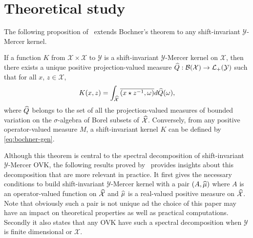 \section{Theoretical study}
The following proposition of~\citet{Zhang2012,Carmeli2010} extends Bochner's
theorem to any shift-invariant $\mathcal{Y}$-Mercer kernel.
\begin{proposition}
    \label{pr:operator_valued_bochner}
    If a function $K$ from $\mathcal{X} \times \mathcal{X}$ to $\mathcal{Y}$ is
    a shift-invariant $\mathcal{Y}$-Mercer kernel on $\mathcal{X}$, then there
    exists a unique positive projection-valued measure $\widehat{Q}:
    \mathcal{B}(\mathcal{X}) \to
    \mathcal{L}_+(\mathcal{Y})$ such that for all $x$, $z \in \mathcal{X}$,
    \begin{dmath} 
        \label{eq:bochner-gen} 
        K(x, z) = \int_{\dual{\mathcal{X}}} \conj{\pairing{x \groupop \inv{z},
        \omega}} d\dual{Q}(\omega),
    \end{dmath}
    where $\widehat{Q}$ belongs to the set of all the projection-valued measures
    of bounded variation on the $\sigma$-algebra of Borel subsets of
    $\widehat{\mathcal{X}}$. Conversely, from any positive operator-valued measure
    $M$, a shift-invariant kernel $K$ can be defined by \cref{eq:bochner-gen}.
\end{proposition}
Although this theorem is central to the spectral decomposition of
shift-invariant $\mathcal{Y}$-Mercer \acs{OVK}, the following results proved
by~\citet{Carmeli2010} provides insights about this decomposition that are more
relevant in practice. It first gives the necessary conditions to build
shift-invariant $\mathcal{Y}$-Mercer kernel with a pair $(A, \widehat{\mu})$ where
$A$ is an operator-valued function on $\widehat{\mathcal{X}}$ and $\widehat{\mu}$ is
a real-valued positive measure on $\widehat{\mathcal{X}}$. Note that obviously
such a pair is not unique ad the choice of this paper may have an impact on
theoretical properties as well as practical computations.  Secondly it also
states that any \acs{OVK} have such a spectral decomposition when $\mathcal{Y}$
is finite dimensional or $\mathcal{X}$.

